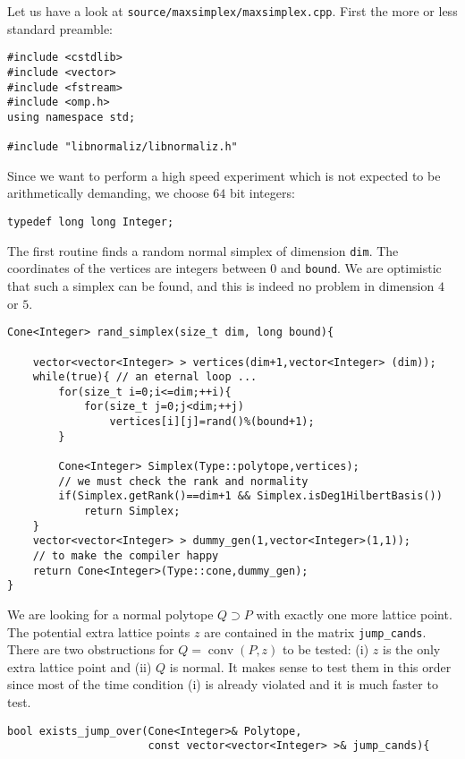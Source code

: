 \begin{small}
Let us have a look at \verb|source/maxsimplex/maxsimplex.cpp|. First the more or less standard preamble:

\begin{Verbatim}
#include <cstdlib>
#include <vector>
#include <fstream>
#include <omp.h>
using namespace std;

#include "libnormaliz/libnormaliz.h"
\end{Verbatim}

Since we want to perform a high speed experiment which is not expected to be arithmetically demanding, we choose $64$ bit integers:
\begin{Verbatim}
typedef long long Integer;
\end{Verbatim}

The first routine finds a random normal simplex of dimension \verb|dim|. The coordinates of the vertices are integers between $0$ and \verb|bound|. We are optimistic that such a simplex can be found, and this is indeed no problem in dimension $4$ or $5$.

\begin{Verbatim}
Cone<Integer> rand_simplex(size_t dim, long bound){

    vector<vector<Integer> > vertices(dim+1,vector<Integer> (dim));
    while(true){ // an eternal loop ...
        for(size_t i=0;i<=dim;++i){
            for(size_t j=0;j<dim;++j)
                vertices[i][j]=rand()%(bound+1);
        }

        Cone<Integer> Simplex(Type::polytope,vertices);
        // we must check the rank and normality
        if(Simplex.getRank()==dim+1 && Simplex.isDeg1HilbertBasis())
            return Simplex;
    }
    vector<vector<Integer> > dummy_gen(1,vector<Integer>(1,1)); 
    // to make the compiler happy
    return Cone<Integer>(Type::cone,dummy_gen); 
}
\end{Verbatim}

We are looking for a normal polytope $Q\supset P$ with exactly one more lattice point. The potential extra lattice points $z$ are contained in the matrix \verb|jump_cands|. There are two obstructions for $Q=\operatorname{conv}(P,z)$ to be tested: (i) $z$ is the only extra lattice point and (ii) $Q$ is normal. It makes sense to test them in this order since most of the time condition (i) is already violated and it is much faster to test.
\begin{Verbatim}
bool exists_jump_over(Cone<Integer>& Polytope, 
                      const vector<vector<Integer> >& jump_cands){


\end{Verbatim}
\end{small}
